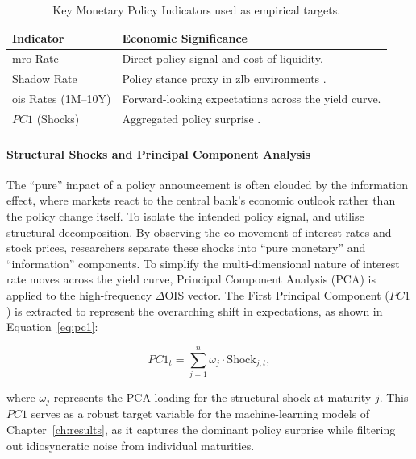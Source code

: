 \begin{table}[ht]
    \centering
    \caption{Key Monetary Policy Indicators used as empirical targets.}
    \label{tab:mp_indicators}
    \begin{tabular}{@{}ll@{}}
        \toprule
        \textbf{Indicator}        & \textbf{Economic Significance}                                        \\ \midrule
        \gls{mro} Rate            & Direct policy signal and cost of liquidity.                           \\
        Shadow Rate               & Policy stance proxy in \gls{zlb} environments \cite{wu2016measuring}. \\
        \gls{ois} Rates (1M--10Y) & Forward-looking expectations across the yield curve.                  \\
        $PC1$ (Shocks)            & Aggregated policy surprise \cite{jarocinski2020deconstructing}.       \\ \bottomrule
    \end{tabular}
\end{table}

\paragraph{Structural Shocks and Principal Component Analysis}
The ``pure'' impact of a policy announcement is often clouded by the information effect, where markets react to the central bank's economic outlook rather than the policy change itself. To isolate the intended policy signal, \cite{jarocinski2020deconstructing} and \cite{altavilla2019measuring} utilise structural decomposition. By observing the co-movement of interest rates and stock prices, researchers separate these shocks into ``pure monetary'' and ``information'' components. To simplify the multi-dimensional nature of interest rate moves across the yield curve, Principal Component Analysis (PCA) is applied to the high-frequency $\Delta \text{OIS}$ vector. The First Principal Component ($PC1$) is extracted to represent the overarching shift in expectations, as shown in Equation~\ref{eq:pc1}:

\begin{equation}
    \label{eq:pc1}
    PC1_t = \sum_{j=1}^{n} \omega_j \cdot \text{Shock}_{j,t},
\end{equation}

where $\omega_j$ represents the PCA loading for the structural shock at maturity $j$. This $PC1$ serves as a robust target variable for the machine-learning models of Chapter~\ref{ch:results}, as it captures the dominant policy surprise while filtering out idiosyncratic noise from individual maturities.

